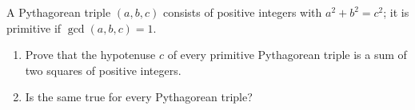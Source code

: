 A Pythagorean triple $(a,b,c)$ consists of positive integers with $a^2+b^2=c^2$; it is primitive if $\gcd(a,b,c)=1$.
\begin{enumerate}
\item[(a)] Prove that the hypotenuse $c$ of every primitive Pythagorean triple is a sum of two squares of positive integers.
\item[(b)] Is the same true for every Pythagorean triple?
\end{enumerate}
